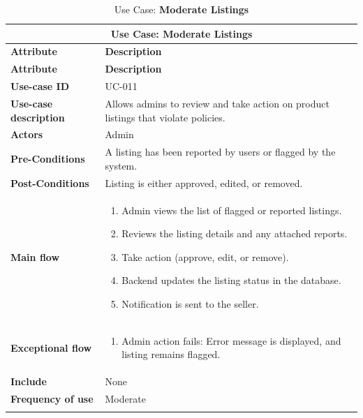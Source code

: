 \documentclass[12pt]{report}
\begin{document}
\begin{appendices}
	\begin{longtable}[H]{|l|p{9cm}||}
		\hline
		\multicolumn{2}{|c||}{\textbf{Use Case: Moderate Listings}}                                                        \\
		\hline
		\textbf{Attribute}            & \textbf{Description}                                                               \\
		\hline
		\endfirsthead
		\hline
		\textbf{Attribute}            & \textbf{Description}                                                               \\
		\hline
		\endhead
		\textbf{Use-case ID}          & UC-011                                                                             \\
		\hline
		\textbf{Use-case description} & Allows admins to review and take action on product listings that violate policies. \\
		\hline
		\textbf{Actors}               & Admin                                                                              \\
		\hline
		\textbf{Pre-Conditions}       & A listing has been reported by users or flagged by the system.                     \\
		\hline
		\textbf{Post-Conditions}      & Listing is either approved, edited, or removed.                                    \\
		\hline
		\textbf{Main flow}            & \begin{enumerate}
			                                \item Admin views the list of flagged or reported listings.
			                                \item Reviews the listing details and any attached reports.
			                                \item Take action (approve, edit, or remove).
			                                \item Backend updates the listing status in the database.
			                                \item Notification is sent to the seller.
		                                \end{enumerate}                         \\
		\hline
		\textbf{Exceptional flow}     & \begin{enumerate}
			                                \item Admin action fails: Error message is displayed, and listing remains flagged.
		                                \end{enumerate}  \\
		\hline
		\textbf{Include}              & None                                                                               \\
		\hline
		\textbf{Frequency of use}     & Moderate                                                                           \\
		\hline
		\hline
		\caption{Use Case: \textbf{Moderate Listings}}\label{tab:tableModerateListing}
	\end{longtable}


\end{appendices}
\end{document}
